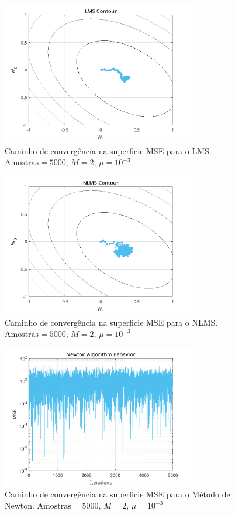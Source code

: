 \documentclass[a4paper,10pt]{article}
\begin{document}
\begin{enumerate}
				\begin{figure}[!ht]
					\centering
					\includegraphics[width=0.75\textwidth]{figs/lms_contour.png}
					\caption{Caminho de convergência na superficie MSE para o LMS. $\text{Amostras} = 5000$, $M = 2$, $\mu = 10^{-3}$}
					\label{fig:lms_contour}
				\end{figure}

				\begin{figure}[!ht]
					\centering
					\includegraphics[width=0.75\textwidth]{figs/nlms_contour.png}
					\caption{Caminho de convergência na superficie MSE para o NLMS. $\text{Amostras} = 5000$, $M = 2$, $\mu = 10^{-3}$}
					\label{fig:nlms_contour}
				\end{figure}

				\begin{figure}[!ht]
					\centering
					\includegraphics[width=0.75\textwidth]{figs/newton_mse.png}
					\caption{Caminho de convergência na superficie MSE para o Método de Newton. $\text{Amostras} = 5000$, $M = 2$, $\mu = 10^{-3}$}
					\label{fig:newton_mse}
				\end{figure}
				

\end{enumerate}
\end{document}

